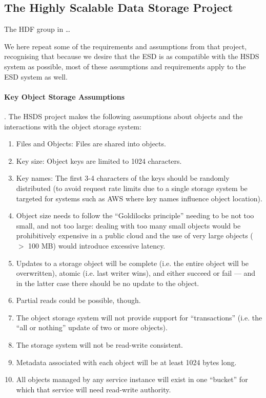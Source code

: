 \subsection{The Highly Scalable Data Storage Project}

The HDF group in \dots
{}

We here repeat some of the requirements and assumptions from that project,
recognising that because we desire that the ESD is as compatible with the HSDS system as possible, most of these assumptions and requirements apply to the ESD
system as well.

\paragraph{Key Object Storage Assumptions}. The HSDS project makes the following assumptions about objects and the interactions with the object storage system:
\begin{enumerate}
    \item Files and Objects: Files are shared into objects.
    \item Key size: Object keys are limited to 1024 characters.
    \item Key names: The first 3-4 characters of the keys should be randomly distributed (to avoid request rate limits due to a single storage system be targeted for systems such as AWS where key names influence object location).
    \item Object size needs to follow the ``Goldilocks principle'' needing to be not too small, and not too large: dealing with too many small objects would be prohibitively expensive in a public cloud and the use of very large objects ($>$ 100 MB) would introduce excessive latency.
    \item Updates to a storage object will be complete (i.e. the entire object will be overwritten), atomic (i.e. last writer wins), and either succeed or fail --- and in the latter case there should be no update to the object.
    \item Partial reads could be possible, though.
    \item The object storage system will not provide support for ``transactions'' (i.e. the ``all or nothing'' update of two or more objects).
    \item The storage system will not be read-write consistent.
    \item Metadata associated with each object will be at least 1024 bytes long.
    \item All objects managed by any service instance will exist in one ``bucket'' for which that service will need read-write authority.
\end{enumerate}


